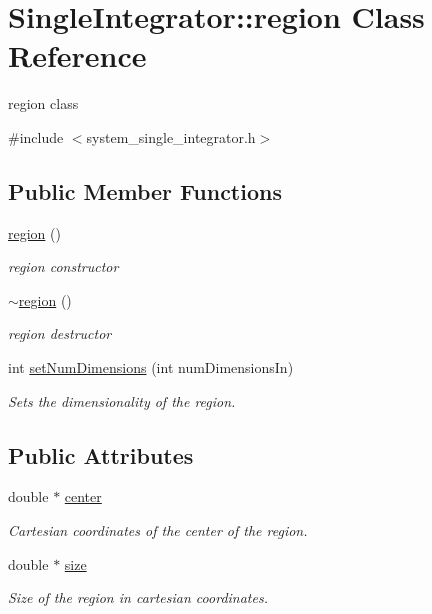 \hypertarget{class_single_integrator_1_1region}{\section{Single\-Integrator\-:\-:region Class Reference}
\label{class_single_integrator_1_1region}
}


region class  




{\ttfamily \#include $<$system\-\_\-single\-\_\-integrator.\-h$>$}

\subsection*{Public Member Functions}
\begin{DoxyCompactItemize}
\item 
\hyperlink{class_single_integrator_1_1region_a04c35dec3576e9c960cfc187d107cf4e}{region} ()
\begin{DoxyCompactList}\small\item\em region constructor \end{DoxyCompactList}\item 
\hyperlink{class_single_integrator_1_1region_a21c21d2652916afe4eabf33d6b0ddd5b}{$\sim$region} ()
\begin{DoxyCompactList}\small\item\em region destructor \end{DoxyCompactList}\item 
int \hyperlink{class_single_integrator_1_1region_a7b186094857c27f55baabcbe61e767f8}{set\-Num\-Dimensions} (int num\-Dimensions\-In)
\begin{DoxyCompactList}\small\item\em Sets the dimensionality of the region. \end{DoxyCompactList}\end{DoxyCompactItemize}
\subsection*{Public Attributes}
\begin{DoxyCompactItemize}
\item 
double $\ast$ \hyperlink{class_single_integrator_1_1region_ac367d8adb1be3f99398e81b5ec36b037}{center}
\begin{DoxyCompactList}\small\item\em Cartesian coordinates of the center of the region. \end{DoxyCompactList}\item 
double $\ast$ \hyperlink{class_single_integrator_1_1region_a9d6383ae1033e22b80fe6f2fdebbfaed}{size}
\begin{DoxyCompactList}\small\item\em Size of the region in cartesian coordinates. \end{DoxyCompactList}\end{DoxyCompactItemize}



